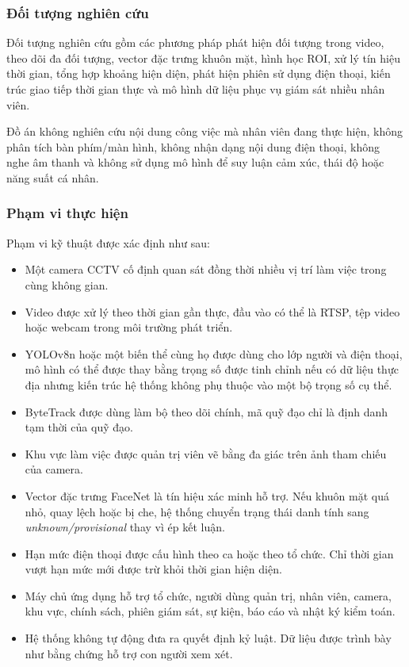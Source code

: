 \subsubsection{Đối tượng nghiên cứu}
Đối tượng nghiên cứu gồm các phương pháp phát hiện đối tượng trong video, theo dõi đa đối tượng, vector đặc trưng khuôn mặt, hình học ROI, xử lý tín hiệu thời gian, tổng hợp khoảng hiện diện, phát hiện phiên sử dụng điện thoại, kiến trúc giao tiếp thời gian thực và mô hình dữ liệu phục vụ giám sát nhiều nhân viên.

Đồ án không nghiên cứu nội dung công việc mà nhân viên đang thực hiện, không phân tích bàn phím/màn hình, không nhận dạng nội dung điện thoại, không nghe âm thanh và không sử dụng mô hình để suy luận cảm xúc, thái độ hoặc năng suất cá nhân.

\subsubsection{Phạm vi thực hiện}
Phạm vi kỹ thuật được xác định như sau:
\begin{itemize}
\item Một camera CCTV cố định quan sát đồng thời nhiều vị trí làm việc trong cùng không gian.
\item Video được xử lý theo thời gian gần thực, đầu vào có thể là RTSP, tệp video hoặc webcam trong môi trường phát triển.
\item YOLOv8n hoặc một biến thể cùng họ được dùng cho lớp người và điện thoại, mô hình có thể được thay bằng trọng số được tinh chỉnh nếu có dữ liệu thực địa nhưng kiến trúc hệ thống không phụ thuộc vào một bộ trọng số cụ thể.
\item ByteTrack được dùng làm bộ theo dõi chính, mã quỹ đạo chỉ là định danh tạm thời của quỹ đạo.
\item Khu vực làm việc được quản trị viên vẽ bằng đa giác trên ảnh tham chiếu của camera.
\item Vector đặc trưng FaceNet là tín hiệu xác minh hỗ trợ. Nếu khuôn mặt quá nhỏ, quay lệch hoặc bị che, hệ thống chuyển trạng thái danh tính sang \textit{unknown/provisional} thay vì ép kết luận.
\item Hạn mức điện thoại được cấu hình theo ca hoặc theo tổ chức. Chỉ thời gian vượt hạn mức mới được trừ khỏi thời gian hiện diện.
\item Máy chủ ứng dụng hỗ trợ tổ chức, người dùng quản trị, nhân viên, camera, khu vực, chính sách, phiên giám sát, sự kiện, báo cáo và nhật ký kiểm toán.
\item Hệ thống không tự động đưa ra quyết định kỷ luật. Dữ liệu được trình bày như bằng chứng hỗ trợ con người xem xét.
\end{itemize}

